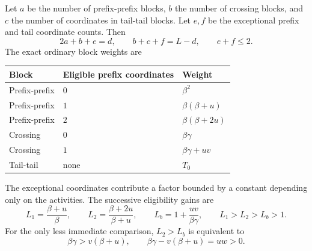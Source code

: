 \documentclass[11pt,letterpaper]{article}
\theoremstyle{definition}
\begin{document}
Let $a$ be the number of prefix-prefix blocks, $b$ the number of crossing blocks, and $c$ the number of coordinates in tail-tail blocks. Let $e,f$ be the exceptional prefix and tail coordinate counts. Then
\begin{equation}\label{ska:eq:blockcounts}
2a+b+e=d,\qquad b+c+f=L-d,\qquad e+f\le2.
\end{equation}
The exact ordinary block weights are
\begin{center}
\begin{tabular}{@{}lll@{}}
\toprule
Block & Eligible prefix coordinates & Weight\\
\midrule
Prefix-prefix & $0$ & $\beta^2$\\
Prefix-prefix & $1$ & $\beta(\beta+u)$\\
Prefix-prefix & $2$ & $\beta(\beta+2u)$\\
Crossing & $0$ & $\beta\gamma$\\
Crossing & $1$ & $\beta\gamma+uv$\\
Tail-tail & none & $T_0$\\
\bottomrule
\end{tabular}
\end{center}
The exceptional coordinates contribute a factor bounded by a constant depending only on the activities. The successive eligibility gains are
\begin{equation}\label{ska:eq:gains}
L_1=\frac{\beta+u}{\beta},\qquad
L_2=\frac{\beta+2u}{\beta+u},\qquad
L_b=1+\frac{uv}{\beta\gamma},\qquad
L_1>L_2>L_b>1.
\end{equation}
For the only less immediate comparison, $L_2>L_b$ is equivalent to
\[
\beta\gamma>v(\beta+u),\qquad
\beta\gamma-v(\beta+u)=uw>0.
\]
\end{document}
